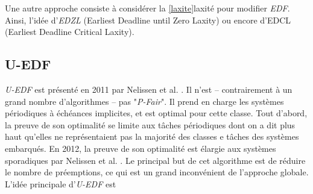 \documentclass[11pt,a4paper,oneside]{report}
\begin{document}
Une autre approche consiste à considérer la \ref{laxite}{laxité} pour modifier \textit{EDF}. 
Ainsi, l'idée d'\textit{EDZL} (Earliest Deadline until Zero Laxity) \cite{cirinei_edzl_2007} ou encore d'EDCL \cite{kato_real-time_2007}
(Earliest Deadline Critical Laxity). \\

\subsection{U-EDF}
\textit{U-EDF} est présenté en 2011 par Nelissen et al. \cite{nelissen_reducing_2011}. Il n'est -- contrairement à un grand nombre d'algorithmes -- pas "\textit{P-Fair}". 
Il prend en charge les systèmes périodiques à échéances implicites, et est optimal pour cette classe. 
Tout d'abord, la preuve de son optimalité se limite aux tâches périodiques dont on a dit plus haut qu'elles 
ne représentaient pas la majorité des classes e tâches des systèmes embarqués. 
En 2012, la preuve de son optimalité est élargie aux systèmes sporadiques par  Nelissen et al. \cite{nelissen_u-edf:_2012}. Le principal but de cet algorithme est de réduire le nombre de préemptions, 
ce qui est un grand inconvénient de l'approche globale. \\
L'idée principale d'\textit{U-EDF} est 
\end{document}
